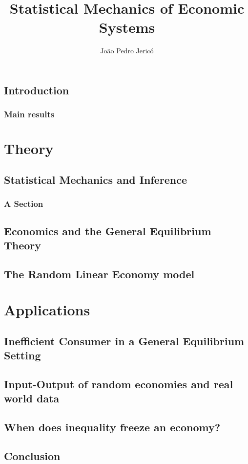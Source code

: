 \documentclass[
  twoside,
  11pt, a4paper,
  footinclude=true,
  headinclude=true,
  cleardoublepage=empty
]{scrbook}
\title{Statistical Mechanics of Economic Systems}
\author{João Pedro Jericó}
\begin{document}
\maketitle








\chapter{Introduction}


\section{Main results}


\part{Theory}


\chapter{Statistical Mechanics and Inference}

\section{A Section}

\chapter{Economics and the General Equilibrium Theory}



\chapter{The Random Linear Economy model}



\part{Applications}

\chapter{Inefficient Consumer in a General Equilibrium Setting}

\chapter{Input-Output of random economies and real world data}

\chapter{When does inequality freeze an economy?}

\chapter{Conclusion}


{}

    
\end{document}
